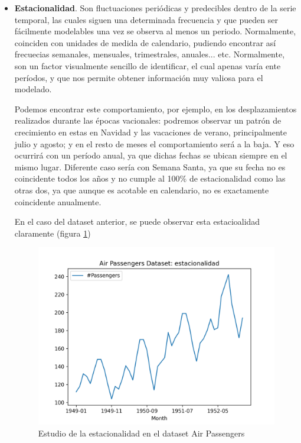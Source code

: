 \begin{itemize}
	\item \textbf{Estacionalidad}. Son fluctuaciones periódicas y predecibles dentro de la serie temporal, las cuales siguen una determinada frecuencia y que pueden ser fácilmente modelables una vez se observa al menos un periodo. Normalmente, coinciden con unidades de medida de calendario, pudiendo encontrar así frecuecias semanales, mensuales, trimestrales, anuales... etc. Normalmente, son un factor visualmente sencillo de identificar, el cual apenas varía ente períodos, y que nos permite obtener información muy valiosa para el modelado.
	
	Podemos encontrar este comportamiento, por ejemplo, en los desplazamientos realizados durante las épocas vacionales: podremos observar un patrón de crecimiento en estas en Navidad y las vacaciones de verano, principalmente julio y agosto; y en el resto de meses el comportamiento será a la baja. Y eso ocurrirá con un período anual, ya que dichas fechas se ubican siempre en el mismo lugar. Diferente caso sería con Semana Santa, ya que su fecha no es coincidente todos los años y no cumple al 100\% de estacionalidad como las otras dos, ya que aunque es acotable en calendario, no es exactamente coincidente anualmente.
	
	En el caso del dataset anterior, se puede observar esta estacioalidad claramente (figura \ref{season})
	
		\begin{figure}[h] %
		\centering
		\includegraphics[scale=0.6]{img/season}
		\caption{Estudio de la estacionalidad en el dataset Air Passengers}
		\label{season}
	\end{figure}  	
	

\end{itemize}
